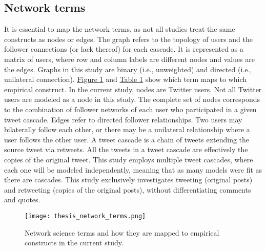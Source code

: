 \documentclass[11pt,a4paper]{article}
\begin{document}
    \subsection{Network terms}
    \hypertarget{sec:network-terms}{}
    It is essential to map the network terms, as not all studies treat the same constructs as nodes or edges. The graph refers to the topology of users and the follower connections (or lack thereof) for each cascade. It is represented as a matrix of users, where row and column labels are different nodes and values are the edges. Graphs in this study are binary (i.e., unweighted) and directed (i.e., unilateral connection). \hyperlink{fig:figure1}{Figure 1} and \hyperlink{fig:table1}{Table 1} show which term maps to which empirical construct. In the current study, nodes are Twitter users. Not all Twitter users are modeled as a node in this study. The complete set of nodes corresponds to the combination of follower networks of each user who participated in a given tweet cascade. Edges refer to directed follower relationships. Two users may bilaterally follow each other, or there may be a unilateral relationship where a user follows the other user. A tweet cascade is a chain of tweets extending the source tweet via retweets. All the tweets in a tweet cascade are effectively the copies of the original tweet. This study employs multiple tweet cascades, where each one will be modeled independently, meaning that as many models were fit as there are cascades. This study exclusively investigates tweeting (original posts) and retweeting (copies of the original posts), without differentiating comments and quotes.\\
    
\begin{figure}[H]
    \hypertarget{fig:figure1}{}
    \centering
    \texttt{[image: thesis\_network\_terms.png]}\\
    \caption{Network science terms and how they are mapped to empirical constructs in the current study.}        
    \label{fig:enter-label}
\end{figure}
\end{document}
